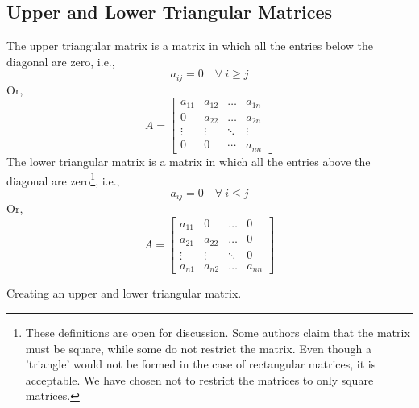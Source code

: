 \subsection{Upper and Lower Triangular Matrices}
The upper triangular matrix is a matrix in which all the entries below the diagonal are zero, i.e.,
\[a_{ij}=0\quad \forall \ i\geq j\]
Or,
\[A=\begin{bmatrix}
		a_{11} & a_{12} & \dots  & a_{1n} \\
		0      & a_{22} & \dots  & a_{2n} \\
		\vdots & \vdots & \ddots & \vdots \\
		0      & 0      & \cdots & a_{nn}
	\end{bmatrix}\]
The lower triangular matrix is a matrix in which all the entries above the diagonal are zero\footnote{These definitions are open for discussion. Some authors claim that the matrix must be square, while some do not restrict the matrix. Even though a 'triangle' would not be formed in the case of rectangular matrices, it is acceptable. We have chosen not to restrict the matrices to only square matrices.}, i.e.,
\[a_{ij}=0\quad \forall \ i\leq j\]
Or,
\[A=\begin{bmatrix}
		a_{11} & 0      & \dots  & 0      \\
		a_{21} & a_{22} & \dots  & 0      \\
		\vdots & \vdots & \ddots & 0      \\
		a_{n1} & a_{n2} & \dots  & a_{nn}
	\end{bmatrix}\]
\begin{eg}
	Creating an upper and lower triangular matrix.
\end{eg}
